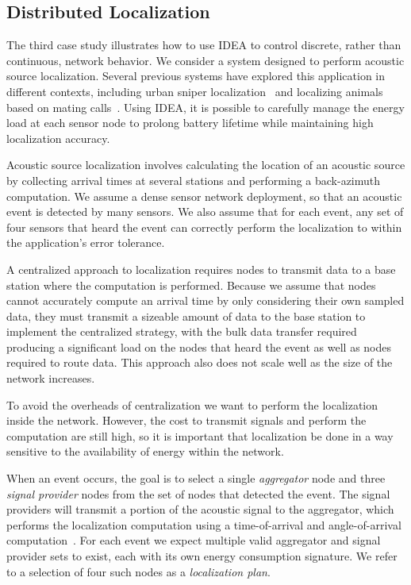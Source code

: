 \documentclass{sig-alternate}
\begin{document}
\subsection{Distributed Localization}

The third case study illustrates how to use IDEA to control discrete, rather
than continuous, network behavior. We consider a system designed to perform
acoustic source localization. Several previous systems have explored this
application in different contexts, including urban sniper
localization~\cite{shooter-localization} and localizing animals based on
mating calls~\cite{girod-marmots}. Using IDEA, it is possible to carefully
manage the energy load at each sensor node to prolong battery lifetime while
maintaining high localization accuracy.

Acoustic source localization involves calculating the location of an acoustic
source by collecting arrival times at several stations and performing a
back-azimuth computation. We assume a dense sensor network deployment, so
that an acoustic event is detected by many sensors. We also assume that for
each event, any set of four sensors that heard the event can correctly
perform the localization to within the application's error tolerance. 

A centralized approach to localization requires nodes to transmit data to a
base station where the computation is performed. Because we assume that nodes
cannot accurately compute an arrival time by only considering their own
sampled data, they must transmit a sizeable amount of data to the base
station to implement the centralized strategy, with the bulk data transfer
required producing a significant load on the nodes that heard the event as
well as nodes required to route data. This approach also does not scale well
as the size of the network increases.

To avoid the overheads of centralization we want to perform the localization
inside the network. However, the cost to transmit signals and perform the
computation are still high, so it is important that localization be done in a
way sensitive to the availability of energy within the network.

When an event occurs, the goal is to select a single \textit{aggregator} node
and three \textit{signal provider} nodes from the set of nodes that detected
the event. The signal providers will transmit a portion of the acoustic
signal to the aggregator, which performs the localization computation using a
time-of-arrival and angle-of-arrival computation~\cite{Niculescu03adhoc}.
For each event we expect multiple valid aggregator and signal provider sets
to exist, each with its own energy consumption signature. We refer to a
selection of four such nodes as a \textit{localization plan}. 
\end{document}
